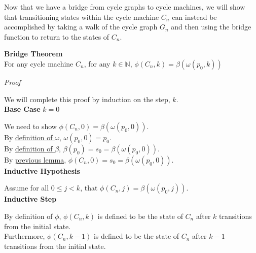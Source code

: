 \documentclass[a4paper,12pt]{article}
\begin{document}
\noindent Now that we have a bridge from cycle graphs to cycle machines, we will show that transitioning states within the cycle machine $C_n$ can instead be accomplished by taking a walk of the cycle graph $G_n$ and then using the bridge function to return to the states of $C_n$.\\






\label{theorem:bridge_theorem}
\hypertarget{theorem:bridge_theorem}{}
\begin{tcolorbox}
\textbf{Bridge Theorem}\\
For any cycle machine $C_n$, for any $k \in \mathbb{N}$, $\phi(C_n, k) = \beta(\omega(p_0, k))$
\end{tcolorbox}

\noindent
\textit{Proof}

\noindent We will complete this proof by induction on the step, $k$.\\


\noindent
\textbf{Base Case} $k = 0$

\noindent We need to show $\phi(C_n, 0) = \beta(\omega(p_0, 0))$.\\

\noindent By \hyperlink{definition:walk_functions}{definition of $\omega$}, $\omega(p_0, 0) = p_0$.\\

\noindent By \hyperlink{definition:bridge_function}{definition of $\beta$}, $\beta(p_0) = s_0 = \beta(\omega(p_0, 0))$.\\

\noindent By \hyperlink{lemma:phi_of_0}{previous lemma}, $\phi(C_n, 0) = s_0 = \beta(\omega(p_0, 0))$.\\


\noindent
\textbf{Inductive Hypothesis}

\noindent Assume for all $0 \leq j < k$, that $\phi(C_n, j) = \beta(\omega(p_0, j))$.\\


\noindent
\textbf{Inductive Step}

\noindent By definition of $\phi$, $\phi(C_n, k)$ is defined to be the state of $C_n$ after $k$ transitions from the initial state.\\

\noindent Furthermore, $\phi(C_n, k - 1)$ is defined to be the state of $C_n$ after $k - 1$ transitions from the initial state.\\
\end{document}
